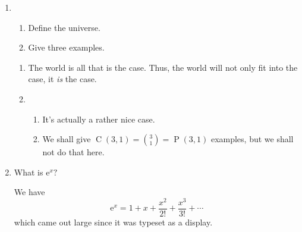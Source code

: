 \documentclass[12pt]{amsart}
\DeclareMathOperator{\perm}{P}
\DeclareMathOperator{\comb}{C}
\newcommand{\e}{\mathrm{e}}
\begin{document}
\begin{enumerate}
\item
  \begin{enumerate}
  \item Define the universe.
  \item Give three examples.
  \end{enumerate}

\bigskip

  \begin{enumerate}
  \item   The world is all that is the case.  Thus, the world will not
    only fit into the case, it \emph{is} the case.
  \item
    \begin{enumerate}
    \item It's actually a rather nice case.
    \item We shall give $\comb(3,1) = \binom{3}{1} = \perm(3,1)$
      examples, but we shall not do that here.
    \end{enumerate}
  \end{enumerate}

\item What is $\e^{x}?$

\bigskip

We have
\begin{displaymath}
  \e^{x} = 1 + x + \frac{x^{2}}{2!} + \frac{x^{3}}{3!} + \cdots
\end{displaymath}
which came out large since it was typeset as a display.

\end{enumerate}
\end{document}
